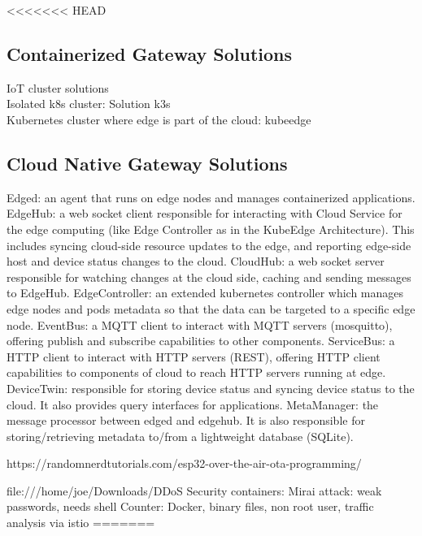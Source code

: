 <<<<<<< HEAD
\subsection{Containerized Gateway Solutions}

IoT cluster solutions\\
Isolated k8s cluster: Solution k3s\\
Kubernetes cluster where edge is part of the cloud: kubeedge\\



\subsection{Cloud Native Gateway Solutions}
Edged: an agent that runs on edge nodes and manages containerized applications.
EdgeHub: a web socket client responsible for interacting with Cloud Service for the edge computing (like Edge Controller as in the KubeEdge Architecture). This includes syncing cloud-side resource updates to the edge, and reporting edge-side host and device status changes to the cloud.
CloudHub: a web socket server responsible for watching changes at the cloud side, caching and sending messages to EdgeHub.
EdgeController: an extended kubernetes controller which manages edge nodes and pods metadata so that the data can be targeted to a specific edge node.
EventBus: a MQTT client to interact with MQTT servers (mosquitto), offering publish and subscribe capabilities to other components.
ServiceBus: a HTTP client to interact with HTTP servers (REST), offering HTTP client capabilities to components of cloud to reach HTTP servers running at edge.
DeviceTwin: responsible for storing device status and syncing device status to the cloud. It also provides query interfaces for applications.
MetaManager: the message processor between edged and edgehub. It is also responsible for storing/retrieving metadata to/from a lightweight database (SQLite).

https://randomnerdtutorials.com/esp32-over-the-air-ota-programming/

file:///home/joe/Downloads/DDoS%
Security containers:
Mirai attack: weak passwords, needs shell
Counter: Docker, binary files, non root user, 
traffic analysis via istio
=======
